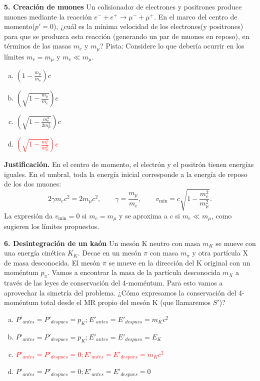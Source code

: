 \textbf{5. Creación de muones}
Un colisionador de electrones y positrones produce muones mediante la reacción
$e^- + e^+ \rightarrow \mu^- + \mu^+$.
En el marco del centro de momento($p'= 0$), ¿cuál es la mínima velocidad de los electrones(y positrones) para que se produzca esta reacción (generando un par de muones en reposo), en términos de las masas $m_e$ y $m_\mu$? Pista: Considere lo que debería ocurrir en los límites $m_e= m_\mu$ y $m_e \ll m_\mu$.
\begin{enumerate}[a)]
    \item $(1 - \frac{m_\mu}{m_e}) c$
    \item $(\sqrt{1 - \frac{m_\mu}{m_e}}) c$
    \item $(\sqrt{1 - \frac{m_e^2}{2m_\mu^2}}) c$
    \item \textcolor{red}{$(\sqrt{1 - \frac{m_e^2}{m_\mu^2}}) c$}
\end{enumerate}

\textbf{Justificación.} En el centro de momento, el electrón y el positrón tienen energías iguales. En el umbral, toda la energía inicial corresponde a la energía de reposo de los dos muones:
\[
2\gamma m_ec^2=2m_\mu c^2,
\qquad \gamma=\frac{m_\mu}{m_e},
\qquad v_{\min}=c\sqrt{1-\frac{m_e^2}{m_\mu^2}}.
\]
La expresión da $v_{\min}=0$ si $m_e=m_\mu$ y se aproxima a $c$ si $m_e\ll m_\mu$, como sugieren los límites propuestos.

\textbf{6. Desintegración de un kaón}
Un mesón K neutro con masa $m_K$ se mueve con una energía cinética $K_K$.
Decae en un mesón $\pi$ con masa $m_\pi$ y otra partícula X de masa desconocida. El mesón $\pi$ se mueve en la dirección del K original con un moméntum $p_\pi$. Vamos a encontrar la masa de la partícula desconocida $m_X$ a través de las leyes de conservación del 4-moméntum.
Para esto vamos a aprovechar la simetría del problema. ¿Cómo expresamos la conservación del 4-moméntum total desde el MR propio del mesón K (que llamaremos $S'$)?
\begin{enumerate}[a)]
    \item $P'_{antes}= P'_{despues}= p_K; E'_{antes}= E'_{despues}= m_K c^2$
    \item $P'_{antes}= P'_{despues}= p_K; E'_{antes}= E'_{despues}= E_K$
    \item \textcolor{red}{$P'_{antes}= P'_{despues}= 0; E'_{antes}= E'_{despues}= m_K c^2$}
    \item $P'_{antes}= P'_{despues}= 0; E'_{antes}= E'_{despues}= 0$
\end{enumerate}

